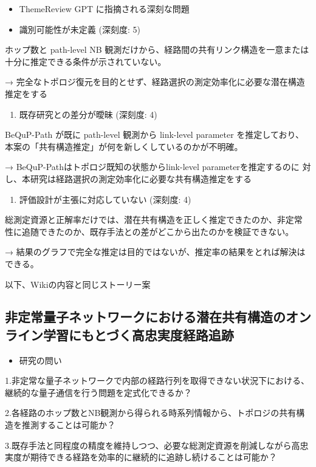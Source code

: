 \documentclass[conference]{IEEEtran}
\begin{document}
\begin{itemize}
\item ThemeReview GPT に指摘される深刻な問題

\item 識別可能性が未定義 (深刻度: 5)
\end{itemize}
ホップ数と path-level NB 観測だけから、経路間の共有リンク構造を一意または十分に推定できる条件が示されていない。

→ 完全なトポロジ復元を目的とせず、経路選択の測定効率化に必要な潜在構造推定をする

\begin{enumerate}
\item 既存研究との差分が曖昧 (深刻度: 4)
\end{enumerate}
BeQuP-Path が既に path-level 観測から link-level parameter を推定しており、本案の「共有構造推定」が何を新しくしているのかが不明確。

→ BeQuP-Pathはトポロジ既知の状態からlink-level parameterを推定するのに
対し、本研究は経路選択の測定効率化に必要な共有構造推定をする

\begin{enumerate}
\item 評価設計が主張に対応していない (深刻度: 4)
\end{enumerate}
総測定資源と正解率だけでは、潜在共有構造を正しく推定できたのか、非定常
性に追随できたのか、既存手法との差がどこから出たのかを検証できない。

→ 結果のグラフで完全な推定は目的ではないが、推定率の結果をとれば解決は
できる。

以下、Wikiの内容と同じストーリー案


\subsection{非定常量子ネットワークにおける潜在共有構造のオンライン学習にもとづく高忠実度経路追跡}
\label{sec:orga803e72}

\begin{itemize}
\item 研究の問い
\end{itemize}

1.非定常な量子ネットワークで内部の経路行列を取得できない状況下における、継続的な量子通信を行う問題を定式化できるか？

2.各経路のホップ数とNB観測から得られる時系列情報から、トポロジの共有構造を推測することは可能か？

3.既存手法と同程度の精度を維持しつつ、必要な総測定資源を削減しながら高忠実度が期待できる経路を効率的に継続的に追跡し続けることは可能か？
\end{document}
